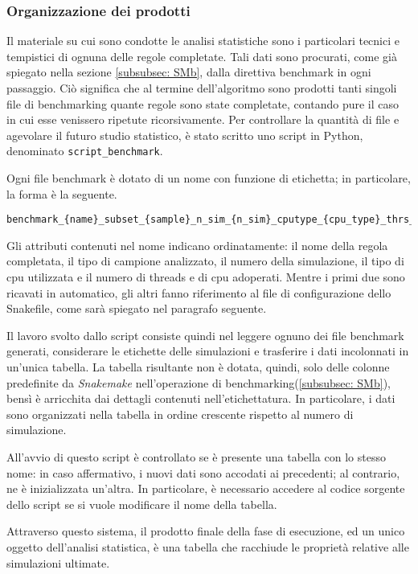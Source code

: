 \subsubsection{Organizzazione dei prodotti}
Il materiale su cui sono condotte le analisi statistiche sono i particolari tecnici e tempistici di ognuna delle regole completate.
Tali dati sono procurati, come già spiegato nella sezione \ref{subsubsec: SMb}, dalla direttiva benchmark in ogni passaggio.
Ciò significa che al termine dell'algoritmo sono prodotti tanti singoli file di benchmarking quante regole sono state completate, contando pure il caso in cui esse venissero ripetute ricorsivamente.
Per controllare la quantità di file e agevolare il futuro studio statistico, è stato scritto uno script in Python, denominato \verb!script_benchmark!.


Ogni file benchmark è dotato di un nome con funzione di etichetta; in particolare, la forma è la seguente.
\begin{lstlisting}[basicstyle=\fontsize{9}{6}\selectfont,breaklines=true]
benchmark_{name}_subset_{sample}_n_sim_{n_sim}_cputype_{cpu_type}_thrs_{thrs}_ncpu{n_cpu}.txt
\end{lstlisting}
Gli attributi contenuti nel nome indicano ordinatamente: il nome della regola completata, il tipo di campione analizzato, il numero della simulazione, il tipo di cpu utilizzata e il numero di threads e di cpu adoperati.
Mentre i primi due sono ricavati in automatico, gli altri fanno riferimento al file di configurazione dello Snakefile, come sarà spiegato nel paragrafo seguente.

Il lavoro svolto dallo script consiste quindi nel leggere ognuno dei file benchmark generati, considerare le etichette delle simulazioni e trasferire i dati incolonnati in un'unica tabella.
La tabella risultante non è dotata, quindi, solo delle colonne predefinite da \textit{Snakemake} nell'operazione di benchmarking(\ref{subsubsec: SMb}), bensì è arricchita dai dettagli contenuti nell'etichettatura.
In particolare, i dati sono organizzati nella tabella in ordine crescente rispetto al numero di simulazione.

All'avvio di questo script è controllato se è presente una tabella con lo stesso nome: in caso affermativo, i nuovi dati sono accodati ai precedenti; al contrario, ne è inizializzata un'altra.
In particolare, è necessario accedere al codice sorgente dello script se si vuole modificare il nome della tabella.

Attraverso questo sistema, il prodotto finale della fase di esecuzione, ed un unico oggetto dell'analisi statistica, è una tabella che racchiude le proprietà relative alle simulazioni ultimate.


